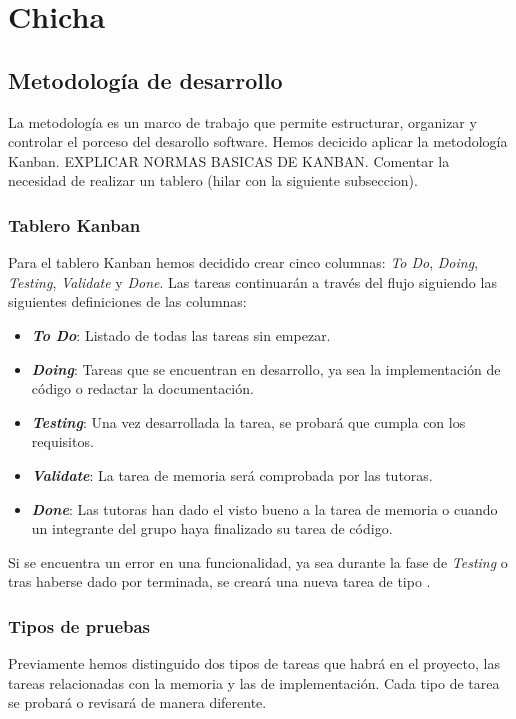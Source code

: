 \chapter{Chicha}
\label{cap:chicha}

\section{Metodología de desarrollo}
La metodología es un marco de trabajo que permite estructurar, organizar y controlar el porceso del desarollo software. Hemos decicido aplicar la metodología Kanban. EXPLICAR NORMAS BASICAS DE KANBAN. Comentar la necesidad de realizar un tablero (hilar con la siguiente subseccion).

\subsection{Tablero Kanban}
Para el tablero Kanban hemos decidido crear cinco columnas: \textit{To Do}, \textit{Doing}, \textit{Testing}, \textit{Validate} y \textit{Done}. Las tareas continuarán a través del flujo siguiendo las siguientes definiciones de las columnas:
\begin{itemize}
    \item \textbf{\textit{To Do}}: Listado de todas las tareas sin empezar.
    \item \textbf{\textit{Doing}}: Tareas que se encuentran en desarrollo, ya sea la implementación de código o redactar la documentación.
    \item \textbf{\textit{Testing}}: Una vez desarrollada la tarea, se probará que cumpla con los requisitos.
    \item \textbf{\textit{Validate}}: La tarea de memoria será comprobada por las tutoras.
    \item \textbf{\textit{Done}}: Las tutoras han dado el visto bueno a la tarea de memoria o cuando un integrante del grupo haya finalizado su tarea de código.
\end{itemize}

Si se encuentra un error en una funcionalidad, ya sea durante la fase de \textit{Testing} o tras haberse dado por terminada, se creará una nueva tarea de tipo .

\subsection{Tipos de pruebas}
Previamente hemos distinguido dos tipos de tareas que habrá en el proyecto, las tareas relacionadas con la memoria y las de implementación. Cada tipo de tarea se probará o revisará de manera diferente.
